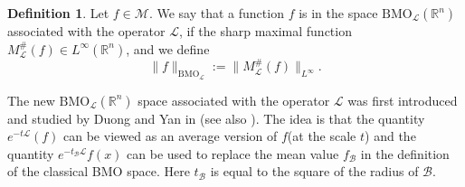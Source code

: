 \documentclass[10pt, reqno]{amsart}
\theoremstyle{definition}
\newtheorem{definition}[theorem]{Definition}
\theoremstyle{remark}
\numberwithin{equation}{section}
\begin{document}
\begin{definition}\label{newbmo}
Let $f\in \mathcal{M}$. We say that a function $f$ is in the space $\mathrm{BMO}_{\mathcal{L}}(\mathbb R^n)$ associated with the operator $\mathcal{L}$, if the sharp maximal function $M^{\#}_{\mathcal{L}}(f)\in L^{\infty}(\mathbb R^n)$, and we define
\begin{equation}\label{newbmonorm}
\big\|f\big\|_{\mathrm{BMO}_{\mathcal{L}}}:=\big\|M^{\#}_{\mathcal{L}}(f)\big\|_{L^{\infty}}.
\end{equation}
\end{definition}
The new $\mathrm{BMO}_{\mathcal{L}}(\mathbb R^n)$ space associated with the operator $\mathcal{L}$ was first introduced and studied by Duong and Yan in \cite{duong3}(see also \cite{deng2,deng,duong2}). The idea is that the quantity $e^{-t\mathcal{L}}(f)$ can be viewed as an average version of $f$(at the scale $t$) and the quantity $e^{-t_{\mathcal{B}}\mathcal{L}}f(x)$ can be used to replace the mean value $f_{\mathcal{B}}$ in the definition of the classical BMO space. Here $t_{\mathcal{B}}$ is equal to the square of the radius of $\mathcal{B}$.
\end{document}
